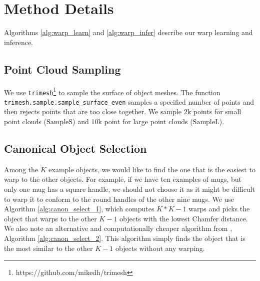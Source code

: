 \documentclass{article}
\newcommand{\evdp}[1]{\textcolor{blue}{[\textbf{EvdP:} #1]}}
\begin{document}

\clearpage



\clearpage
\appendix

\section{Method Details}
\label{appendix:method}

Algorithms \ref{alg:warp_learn} and \ref{alg:warp_infer} describe our warp learning and inference.




\subsection{Point Cloud Sampling}
\label{appendix:method:sampling}

We use \texttt{trimesh}\footnote{https://github.com/mikedh/trimesh} to sample the surface of object meshes. The function \texttt{trimesh.sample.sample\_surface\_even} samples a specified number of points and then rejects points that are too close together. We sample 2k points for small point clouds ($\mathrm{SampleS}$) and 10k point for large point clouds ($\mathrm{SampleL}$).

\subsection{Canonical Object Selection}
\label{appendix:method:canonical}

Among the $K$ example objects, we would like to find the one that is the easiest to warp to the other objects. For example, if we have ten examples of mugs, but only one mug has a square handle, we should not choose it as it might be difficult to warp it to conform to the round handles of the other nine mugs. We use Algorithm \ref{alg:canon_select_1}, which computes $K * K-1$ warps and picks the object that warps to the other $K-1$ objects with the lowest Chamfer distance. We also note an alternative and computationally cheaper algorithm from \citet{thompson21shapebased}, Algorithm \ref{alg:canon_select_2}. This algorithm simply finds the object that is the most similar to the other $K-1$ objects without any warping.
\end{document}
